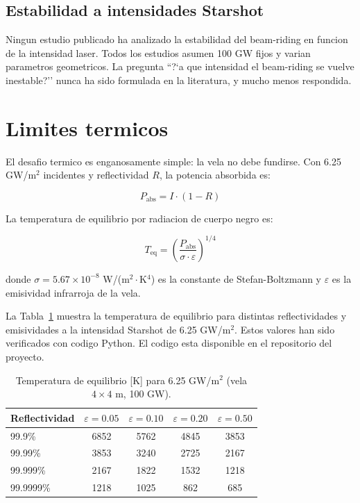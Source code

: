 \documentclass[11pt,a4paper,onecolumn]{article}
\begin{document}
\subsection{Estabilidad a intensidades Starshot}

Ningun estudio publicado ha analizado la estabilidad del beam-riding en funcion de la intensidad laser. Todos los estudios asumen 100 GW fijos y varian parametros geometricos. La pregunta ``?`a que intensidad el beam-riding se vuelve inestable?'' nunca ha sido formulada en la literatura, y mucho menos respondida.

\section{Limites termicos}

El desafio termico es enganosamente simple: la vela no debe fundirse. Con 6.25 GW/m$^2$ incidentes y reflectividad $R$, la potencia absorbida es:

\begin{equation}
P_{\text{abs}} = I \cdot (1 - R)
\end{equation}

La temperatura de equilibrio por radiacion de cuerpo negro es:

\begin{equation}
T_{\text{eq}} = \left(\frac{P_{\text{abs}}}{\sigma \cdot \varepsilon}\right)^{1/4}
\end{equation}

donde $\sigma = 5.67\times10^{-8}$ W/(m$^2\cdot$K$^4$) es la constante de Stefan-Boltzmann y $\varepsilon$ es la emisividad infrarroja de la vela.

La Tabla~\ref{tab:temp} muestra la temperatura de equilibrio para distintas reflectividades y emisividades a la intensidad Starshot de 6.25 GW/m$^2$. Estos valores han sido verificados con codigo Python. El codigo esta disponible en el repositorio del proyecto.

\begin{table}[h]
\centering
\caption{Temperatura de equilibrio [K] para 6.25 GW/m$^2$ (vela $4\times4$ m, 100 GW).}
\label{tab:temp}
\begin{tabular}{lcccc}
\hline
\textbf{Reflectividad} & $\varepsilon=0.05$ & $\varepsilon=0.10$ & $\varepsilon=0.20$ & $\varepsilon=0.50$ \\
\hline
99.9\% & 6852 & 5762 & 4845 & 3853 \\
99.99\% & 3853 & 3240 & 2725 & 2167 \\
99.999\% & 2167 & 1822 & 1532 & 1218 \\
99.9999\% & 1218 & 1025 & 862 & 685 \\
\hline
\end{tabular}
\end{table}
\end{document}
